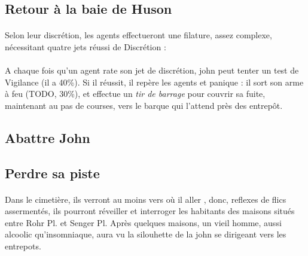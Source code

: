 \subsection{Retour à la baie de Huson}

\paragraph{} Selon leur discrétion, les agents effectueront une filature, assez complexe, nécessitant quatre jets réussi de Discrétion :
\begin{itemize}
\end{itemize}



\paragraph{} A chaque fois qu'un agent rate son jet de discrétion, \gls{john} peut tenter un test de Vigilance (il a 40\%). Si il réussit, il 
repère les agents et panique : il sort son arme à feu (TODO, 30\%), et effectue un \emph{tir de barrage} pour couvrir sa fuite, maintenant au 
pas de courses, vers le barque qui l'attend près des entrepôt.

\subsection{Abattre John}


\subsection{Perdre sa piste}

\paragraph{} Dans le cimetière, ils verront au moins vers où il aller , donc, reflexes de flics assermentés, ils pourront réveiller et interroger les 
habitants des maisons situés entre Rohr Pl. et Senger Pl. Après quelques maisons, un vieil homme, aussi alcoolic qu'insomniaque, aura vu la
silouhette de la \gls{john} se dirigeant vers les entrepots.

